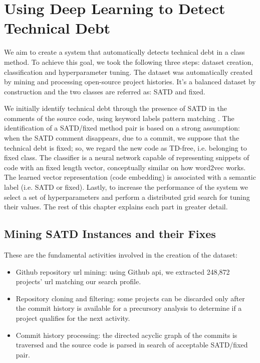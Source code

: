 

\chapter{Using Deep Learning to Detect Technical Debt}

We aim to create a system that automatically detects technical debt in a class method. To achieve this goal, we took the following three steps: dataset creation, classification and hyperparameter tuning.
The dataset was automatically created by mining and processing open-source project histories. It's a balanced dataset by construction and the two classes are referred as: SATD and fixed.

We initially identify technical debt through the presence of SATD in the comments of the source code, using keyword labels pattern matching \cite{potdar2014exploratory} \cite{rantala2020prevalence}.
The identification of a SATD/fixed method pair is based on a strong assumption: when the SATD comment disappears, due to a commit, we suppose that the technical debt is fixed; so, we regard the new code as TD-free, i.e. belonging to fixed class.
The classifier is a neural network capable of representing snippets of code with an fixed length vector, conceptually similar on how word2vec works. The learned vector representation (code embedding) is associated with a semantic label (i.e. SATD or fixed).
Lastly, to increase the performance of the system we select a set of hyperparameters and perform a distributed grid search for tuning their values. The rest of this chapter explains each part in greater detail.

\section{Mining SATD Instances and their Fixes}

These are the fundamental activities involved in the creation of the dataset:
\begin{itemize}
    \item Github repository url mining: using Github api, we extracted 248,872 projects' url matching our search profile.
    \item Repository cloning and filtering: some projects can be discarded only after the commit history is available for a precursory analysis to determine if a project qualifies for the next activity.
    \item Commit history processing: the directed acyclic graph of the commits is traversed and the source code is parsed in search of acceptable SATD/fixed pair.
\end{itemize}

